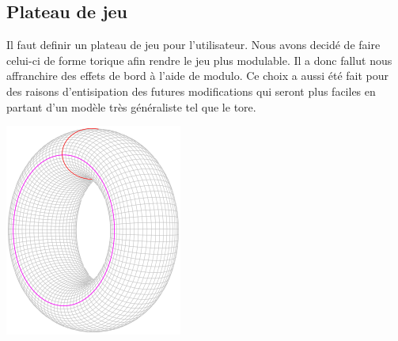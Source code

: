 \subsection{Plateau de jeu}
        Il faut definir un plateau de jeu pour l'utilisateur. Nous avons decidé de faire celui-ci de forme torique afin rendre le jeu plus modulable. Il a donc fallut nous affranchire des effets de bord à l'aide de modulo. Ce choix a aussi été fait pour des raisons d'entisipation des futures modifications qui seront plus faciles en partant d'un modèle très généraliste tel que le tore.
        \begin{center}
        \includegraphics[scale=0.3]{tor.png}
        \end{center}
        
